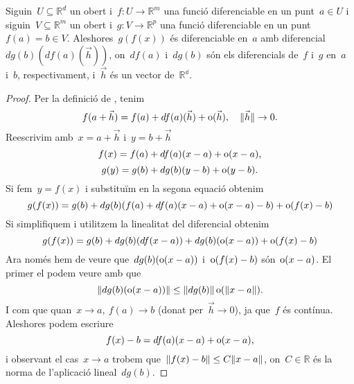 \documentclass[../../main.tex]{subfiles}
\begin{document}
    \begin{theorem}
        \label{thm:regla de la cadena}
        Siguin~\(U\subseteq\mathbb{R}^{d}\) un obert i~\(f\colon U\to\mathbb{R}^{m}\) una funció diferenciable en un punt~\(a\in U\) i siguin~\(V\subseteq\mathbb{R}^{m}\) un obert i~\(g\colon V\to\mathbb{R}^{p}\) una funció diferenciable en un punt~\(f(a)=b\in V\).
        Aleshores~\(g(f(x))\) és diferenciable en~\(a\) amb diferencial~\(dg(b)(df(a)(\vec{h}))\), on~\(df(a)\) i~\(dg(b)\) són els diferencials de~\(f\) i~\(g\) en~\(a\) i~\(b\), respectivament, i~\(\vec{h}\) és un vector de~\(\mathbb{R^{d}}\).
        \begin{proof}
            Per la definició de , tenim
            \[
                f(a+\vec{h})=f(a)+df(a)(\vec{h})+\operatorname{o}(\vec{h}),\quad\lVert\vec{h}\rVert\to0.
            \]
            Reescrivim amb~\(x=a+\vec{h}\) i~\(y=b+\vec{h}\)
            \[
                f(x)=f(a)+df(a)(x-a)+\operatorname{o}(x-a),
            \]
            \[
                g(y)=g(b)+dg(b)(y-b)+\operatorname{o}(y-b).
            \]
            Si fem~\(y=f(x)\) i substituïm en la segona equació obtenim
            \[
                g(f(x))=g(b)+dg(b)(f(a)+df(a)(x-a)+\operatorname{o}(x-a)-b)+\operatorname{o}(f(x)-b)
            \]
            Si simplifiquem i utilitzem la linealitat del diferencial obtenim
            \[
                g(f(x))=g(b)+dg(b)(df(x-a))+dg(b)(\operatorname{o}(x-a))+\operatorname{o}(f(x)-b)
            \]
            Ara només hem de veure que~\(dg(b)(\operatorname{o}(x-a))\) i~\(\operatorname{o}(f(x)-b)\) són~\(\operatorname{o}(x-a)\).
            El primer el podem veure amb que
            \[
                \norm{dg(b)(\omicron(x-a))}\leq\norm{dg(b)}\omicron(\norm{x-a}).
            \] %
            I com que quan~\(x\to a,\ f(a)\to b\) (donat per~\(\vec{h}\to0\)), ja que~\(f\) és contínua.
            Aleshores podem escriure
            \[
                f(x)-b=df(a)(x-a)+\operatorname{o}(x-a),
            \]
            i  observant el cas~\(x\to a\) trobem que~\(\norm{f(x)-b}\leq C\norm{x-a}\), on~\(C\in\mathbb{R}\) és la norma de l'aplicació lineal~\(dg(b)\).
        \end{proof}
    \end{theorem}
\end{document}
